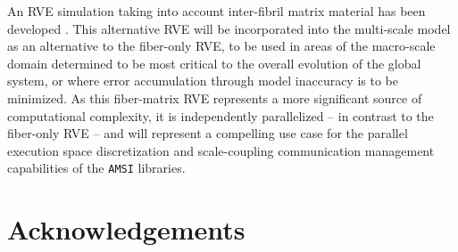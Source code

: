 \documentclass[11pt]{article}
\begin{document}
An RVE simulation taking into account inter-fibril matrix material has been developed \cite{lake2012mechanics,zhang2013cross,zhang2013coupled}. This alternative RVE will be incorporated into the multi-scale model as an alternative to the fiber-only RVE, to be used in areas of the macro-scale domain determined to be most critical to the overall evolution of the global system, or where error accumulation through model inaccuracy is to be minimized. As this fiber-matrix RVE represents a more significant source of computational complexity, it is independently parallelized -- in contrast to the fiber-only RVE -- and will represent a compelling use case for the parallel execution space discretization and scale-coupling communication management capabilities of the \verb|AMSI| libraries.

\section{Acknowledgements}


\end{document}
